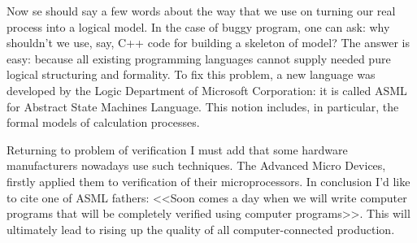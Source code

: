 \documentclass[a4paper]{article}
\begin{document}
Now se should say a few words about the way that we use on turning our real process into a logical model.
In the case of buggy program, one can ask: why shouldn't we use, say, C++ code for building a skeleton of model?
The answer is easy: because all existing programming languages cannot supply needed pure logical structuring
and formality. To fix this problem, a new language was developed by the Logic Department of Microsoft Corporation:
it is called ASML for Abstract State Machines Language. This notion includes, in particular, the formal models
of calculation processes.

Returning to problem of verification I must add that some hardware manufacturers nowadays use such techniques.
The Advanced Micro Devices, firstly applied them to verification of their microprocessors. In conclusion I'd like to
cite one of ASML fathers: <<Soon comes a day when we will write computer programs that will be completely verified
using computer programs>>. This will ultimately lead to rising up the quality of all computer-connected production.
\end{document}
